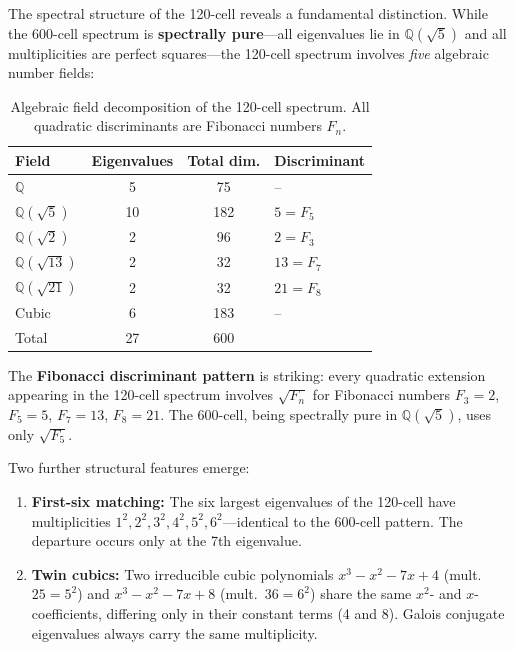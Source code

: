 \documentclass[12pt,a4paper]{article}
\begin{document}
The spectral structure of the 120-cell reveals a fundamental distinction. While the 600-cell spectrum is \textbf{spectrally pure}---all eigenvalues lie in $\mathbb{Q}(\sqrt{5})$ and all multiplicities are perfect squares---the 120-cell spectrum involves \emph{five} algebraic number fields:

\begin{table}[H]
\centering
\begin{tabular}{lccl}
\toprule
\textbf{Field} & \textbf{Eigenvalues} & \textbf{Total dim.} & \textbf{Discriminant} \\
\midrule
$\mathbb{Q}$ & 5 & 75 & -- \\
$\mathbb{Q}(\sqrt{5})$ & 10 & 182 & $5 = F_5$ \\
$\mathbb{Q}(\sqrt{2})$ & 2 & 96 & $2 = F_3$ \\
$\mathbb{Q}(\sqrt{13})$ & 2 & 32 & $13 = F_7$ \\
$\mathbb{Q}(\sqrt{21})$ & 2 & 32 & $21 = F_8$ \\
Cubic & 6 & 183 & -- \\
\midrule
Total & 27 & 600 & \\
\bottomrule
\end{tabular}
\caption{Algebraic field decomposition of the 120-cell spectrum. All quadratic discriminants are Fibonacci numbers $F_n$.}
\label{tab:120cell_spectrum}
\end{table}

The \textbf{Fibonacci discriminant pattern} is striking: every quadratic extension appearing in the 120-cell spectrum involves $\sqrt{F_n}$ for Fibonacci numbers $F_3 = 2$, $F_5 = 5$, $F_7 = 13$, $F_8 = 21$. The 600-cell, being spectrally pure in $\mathbb{Q}(\sqrt{5})$, uses only $\sqrt{F_5}$.

Two further structural features emerge:
\begin{enumerate}
\item \textbf{First-six matching:} The six largest eigenvalues of the 120-cell have multiplicities $1^2, 2^2, 3^2, 4^2, 5^2, 6^2$---identical to the 600-cell pattern. The departure occurs only at the 7th eigenvalue.
\item \textbf{Twin cubics:} Two irreducible cubic polynomials $x^3 - x^2 - 7x + 4$ (mult.~$25 = 5^2$) and $x^3 - x^2 - 7x + 8$ (mult.~$36 = 6^2$) share the same $x^2$- and $x$-coefficients, differing only in their constant terms (4 and 8). Galois conjugate eigenvalues always carry the same multiplicity.
\end{enumerate}
\end{document}

